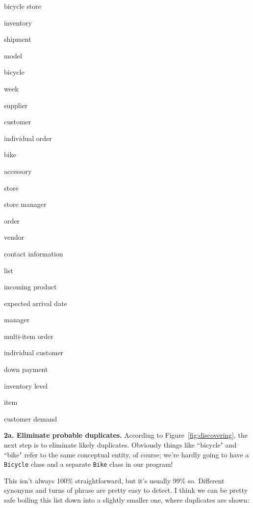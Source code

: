 \begin{samepage}
\begin{multicols}{3}
\small
\begin{compactitem}
\renewcommand\labelitemi{\raisebox{0.25ex}{\tiny$\bullet$}}
\item bicycle store
\item inventory
\item shipment
\item model
\item bicycle
\item week
\item supplier
\item customer
\item individual order
\columnbreak
\item bike
\item accessory
\item store
\item store manager
\item order
\item vendor
\item contact information
\item list
\item incoming product
\columnbreak
\item expected arrival date
\item manager
\item multi-item order
\item individual customer
\item down payment
\item inventory level
\item item
\item customer demand
\end{compactitem}
\end{multicols}
\end{samepage}

\textbf{2a. Eliminate probable duplicates.} According to
Figure~\ref{fig:discovering}, the next step is to eliminate likely duplicates.
Obviously things like ``bicycle" and ``bike" refer to the same conceptual
entity, of course; we're hardly going to have a \texttt{Bicycle} class and a
separate \texttt{Bike} class in our program!

This isn't always 100\% straightforward, but it's usually 99\% so. Different
synonyms and turns of phrase are pretty easy to detect. I think we can be
pretty safe boiling this list down into a slightly smaller one, where
duplicates are shown:

